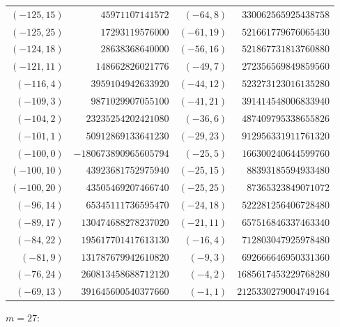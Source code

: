 \documentclass[11pt]{amsart}
\theoremstyle{definition}
\begin{document}
{\scriptsize\begin{tabular}{@{}r@{\ \ }r@{\qquad}r@{\ \ }r@{}}
$(-125,15)$ & $45971107141572$ & $(-64,8)$ & $330062565925438758$ \\
$(-125,25)$ & $17293119576000$ & $(-61,19)$ & $521661779676065430$ \\
$(-124,18)$ & $28638368640000$ & $(-56,16)$ & $521867731813760880$ \\
$(-121,11)$ & $148662826021776$ & $(-49,7)$ & $272356569849859560$ \\
$(-116,4)$ & $3959104942633920$ & $(-44,12)$ & $523273123016135280$ \\
$(-109,3)$ & $9871029907055100$ & $(-41,21)$ & $391414548006833940$ \\
$(-104,2)$ & $23235254202421080$ & $(-36,6)$ & $487409795338655826$ \\
$(-101,1)$ & $50912869133641230$ & $(-29,23)$ & $912956331911761320$ \\
$(-100,0)$ & $-180673890965605794$ & $(-25,5)$ & $166300240644599760$ \\
$(-100,10)$ & $43923681752975940$ & $(-25,15)$ & $88393185594933480$ \\
$(-100,20)$ & $43505469207466740$ & $(-25,25)$ & $87365323849071072$ \\
$(-96,14)$ & $65345111736595470$ & $(-24,18)$ & $522281256406728480$ \\
$(-89,17)$ & $130474688278237020$ & $(-21,11)$ & $657516846337463340$ \\
$(-84,22)$ & $195617701417613130$ & $(-16,4)$ & $712803047925978480$ \\
$(-81,9)$ & $131787679942610820$ & $(-9,3)$ & $692666646950331360$ \\
$(-76,24)$ & $260813458688712120$ & $(-4,2)$ & $1685617453229768280$ \\
$(-69,13)$ & $391645600540377660$ & $(-1,1)$ & $2125330279004749164$ \\
\end{tabular}}\par\medskip
\noindent$m=27$:\nopagebreak\\[2pt]
\end{document}
